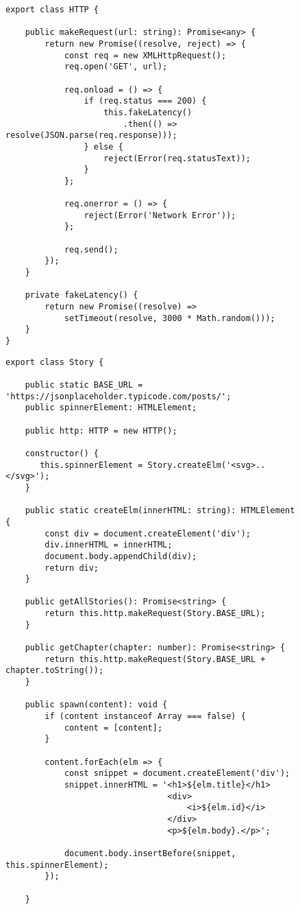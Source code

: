\begin{figure}[H]
\begin{lstlisting}[basicstyle=\small]
export class HTTP {

    public makeRequest(url: string): Promise<any> {
        return new Promise((resolve, reject) => {
            const req = new XMLHttpRequest();
            req.open('GET', url);

            req.onload = () => {
                if (req.status === 200) {
                    this.fakeLatency()
                        .then(() => resolve(JSON.parse(req.response)));
                } else {
                    reject(Error(req.statusText));
                }
            };

            req.onerror = () => {
                reject(Error('Network Error'));
            };

            req.send();
        });
    }

    private fakeLatency() {
        return new Promise((resolve) =>
            setTimeout(resolve, 3000 * Math.random()));
    }
}
\end{lstlisting}
\end{figure}

\begin{figure}[H]
\begin{lstlisting}[basicstyle=\small]
export class Story {

    public static BASE_URL = 'https://jsonplaceholder.typicode.com/posts/';
    public spinnerElement: HTMLElement;

    public http: HTTP = new HTTP();

    constructor() {
       this.spinnerElement = Story.createElm('<svg>..</svg>');
    }

    public static createElm(innerHTML: string): HTMLElement {
        const div = document.createElement('div');
        div.innerHTML = innerHTML;
        document.body.appendChild(div);
        return div;
    }
    
    public getAllStories(): Promise<string> {
        return this.http.makeRequest(Story.BASE_URL);
    }

    public getChapter(chapter: number): Promise<string> {
        return this.http.makeRequest(Story.BASE_URL + chapter.toString());
    }
    
    public spawn(content): void {
        if (content instanceof Array === false) {
            content = [content];
        }

        content.forEach(elm => {
            const snippet = document.createElement('div');
            snippet.innerHTML = '<h1>${elm.title}</h1>
                                 <div>
                                     <i>${elm.id}</i>
                                 </div>
                                 <p>${elm.body}.</p>';

            document.body.insertBefore(snippet, this.spinnerElement);
        });

    }
\end{lstlisting}
\end{figure}

